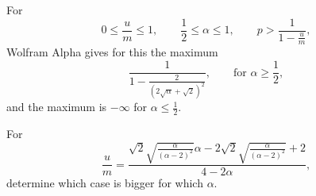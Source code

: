 \documentclass[11pt]{article}
\begin{document}
For
\[
    0 \le \frac{u}{m} \le 1,
    \qquad
    \frac12 \le \alpha \le 1,
    \qquad
    p > \frac{1}{1-\frac{u}{m}},
\]
Wolfram Alpha gives for this the maximum
\[
    \frac{1}{1-\frac{2}{(2\sqrt{\alpha}+\sqrt{2})^2}},
    \qquad \text{for } \alpha \ge \frac12,
\]
and the maximum is $-\infty$ for $\alpha \le \frac12$.

For
\[
    \frac{u}{m}
    =
    \frac{
        \sqrt{2}\sqrt{\frac{\alpha}{(\alpha-2)^2}}\alpha
        - 2\sqrt{2}\sqrt{\frac{\alpha}{(\alpha-2)^2}}
        + 2
    }{
        4 - 2\alpha
    },
\]
determine which case is bigger for which $\alpha$.
\end{document}
